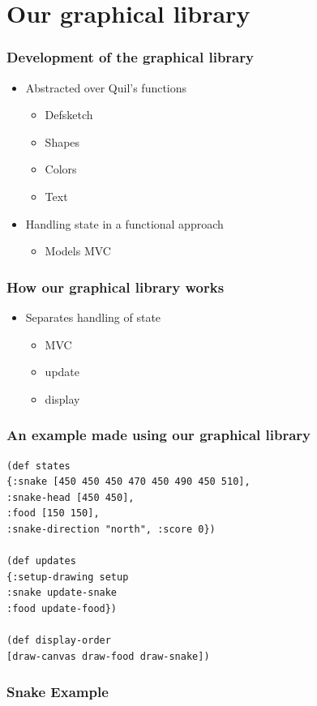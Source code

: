 \documentclass{beamer}
\newcommand{\comment}[1]{{\bf \tt  {#1}}}
\newcommand{\todo}[1]{\textcolor{blue}{\comment{To Do: {#1}}}}
\begin{document}
\section{Our graphical library}

\begin{frame}
\frametitle{Development of the graphical library}
\begin{itemize}
\item Abstracted over Quil's functions
	\begin{itemize}
	\item Defsketch
	\item Shapes
	\item Colors
	\item Text
	\end{itemize}
\item Handling state in a functional approach
	\begin{itemize}
		\item Models MVC
	\end{itemize}
\end{itemize}
\end{frame}


\begin{frame}
\frametitle{How our graphical library works}
\begin{itemize}
\item Separates handling of state
	\begin{itemize}
	\item MVC
	\item update
	\item display
	\end{itemize}
\end{itemize}
\end{frame}

\begin{frame} [fragile]
\frametitle{An example made using our graphical library}
\begin{verbatim}
(def states
{:snake [450 450 450 470 450 490 450 510], 
:snake-head [450 450], 
:food [150 150], 
:snake-direction "north", :score 0})

(def updates
{:setup-drawing setup 
:snake update-snake
:food update-food})

(def display-order
[draw-canvas draw-food draw-snake])
\end{verbatim}
\end{frame}

\begin{frame}
\frametitle{Snake Example}
\begin{center}
\end{center}
\end{frame}
\end{document}
